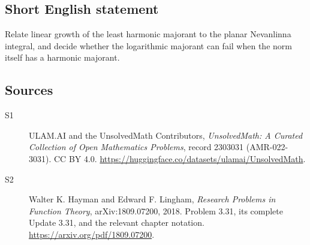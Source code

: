\documentclass[11pt]{book}
\begin{document}
\subsection{Short English statement}
Relate linear growth of the least harmonic majorant to the planar Nevanlinna integral, and decide whether the logarithmic majorant can fail when the norm itself has a harmonic majorant.
\subsection{Sources}
\begin{description}
\item[\hypertarget{source:2303031:1}{S1}] ULAM.AI and the UnsolvedMath Contributors, \emph{UnsolvedMath: A Curated Collection of Open Mathematics Problems}, record 2303031 (AMR-022-3031). CC BY 4.0. \url{https://huggingface.co/datasets/ulamai/UnsolvedMath}.
\item[\hypertarget{source:2303031:2}{S2}] Walter K. Hayman and Edward F. Lingham, \emph{Research Problems in Function Theory}, arXiv:1809.07200, 2018. Problem 3.31, its complete Update 3.31, and the relevant chapter notation. \url{https://arxiv.org/pdf/1809.07200}.
\end{description}
\label{end:2303031}
\end{document}
